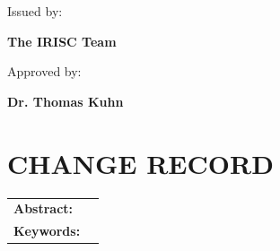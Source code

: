 \documentclass[a4paper,12pt,oneside]{article}
\begin{document}
\begin{flushleft}
\vspace{10pt}

\small
{
Issued by:\\
}

\vspace{0.3cm}

\large
{
\textbf{The IRISC Team} \\
}

\vspace{0.3cm}

\small
{
Approved by:\\
}

\vspace{0.3cm}

\large
{
\textbf{Dr. Thomas Kuhn}
}
\end{flushleft}




\pagestyle{firstp}
\section*{\small{\textbf{CHANGE RECORD}}}
%


\newpage

\vspace{1cm}
\begin{tabular}{p{} p{}}
\textbf{Abstract:}     &  \\ %
\textbf{Keywords:}     & %

\end{tabular}

\vfill



\newpage
\tableofcontents



\newpage

\end{document}
